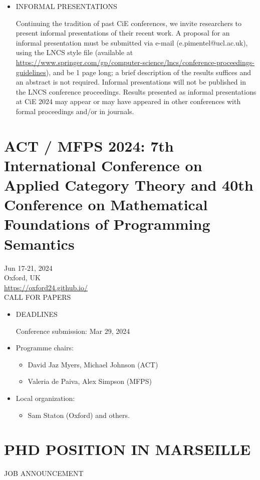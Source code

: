 \documentclass[prodmode,acmtecs]{acmsmall} %
\begin{document}
\begin{itemize}
\item  INFORMAL PRESENTATIONS 
 
  Continuing the tradition of past CiE conferences, we invite researchers to present informal presentations of their recent work. A proposal for an informal presentation must be submitted via e-mail (e.pimentel@ucl.ac.uk), using the LNCS style file (available at \href{https://www.springer.com/gp/computer-science/lncs/conference-proceedings-guidelines}{https://www.springer.com/gp/computer-science/lncs/conference-proceedings-guidelines}), and be 1 page long; a brief description of the results suffices and an abstract is not required. Informal presentations will not be published in the LNCS conference proceedings. Results presented as informal presentations at CiE 2024 may appear or may have appeared in other conferences with formal proceedings and/or in journals. 
 
\end{itemize}\section{ACT / MFPS 2024: 7th International Conference on Applied Category Theory and 40th Conference on Mathematical Foundations of Programming Semantics}\label{ACTMFPS2024}  Jun 17-21, 2024\\ 
  Oxford, UK\\ 
  \href{https://oxford24.github.io/}{https://oxford24.github.io/}\\ 
CALL FOR PAPERS 

\begin{itemize}\item  DEADLINES 
 
Conference submission: Mar 29, 2024 
 
\item  Programme chairs:  
 
\begin{itemize}\item  David Jaz Myers, Michael Johnson (ACT)
\item  Valeria de Paiva, Alex Simpson (MFPS)
\end{itemize} 
\item  Local organization: 
 
\begin{itemize}\item  Sam Staton (Oxford) and others. 
\end{itemize} 
\end{itemize}\section{PHD POSITION IN MARSEILLE}\label{PHDPOSITIONINMARSEILLE}JOB ANNOUNCEMENT 
\end{document}
